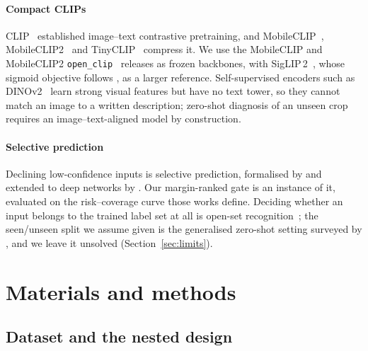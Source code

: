 \documentclass[a4paper,fleqn]{cas-dc}
\begin{document}
\paragraph{Compact CLIPs} CLIP~\citep{radford2021} established image--text contrastive pretraining,
and MobileCLIP~\citep{vasu2024}, MobileCLIP2~\citep{mobileclip2} and TinyCLIP~\citep{wu2023} compress
it. We use the MobileCLIP and MobileCLIP2 \texttt{open\_clip}~\citep{ilharco2021} releases as frozen
backbones, with
SigLIP\,2~\citep{siglip2}, whose sigmoid objective follows \citet{zhai2023}, as a larger reference.
Self-supervised encoders such as DINOv2~\citep{oquab2024} learn strong visual features but have no
text tower, so they cannot match an image to a written description; zero-shot diagnosis of an unseen
crop requires an image--text-aligned model by construction.

\paragraph{Selective prediction} Declining low-confidence inputs is selective prediction, formalised
by \citet{elyaniv2010selective} and extended to deep networks by \citet{geifman2017selective}. Our
margin-ranked gate is an instance of it, evaluated on the risk--coverage curve those works define.
Deciding whether an input belongs to the trained label set at all is open-set
recognition~\citep{scheirer2013openset}; the seen/unseen split we assume given is the generalised
zero-shot setting surveyed by \citet{xian2019gzsl}, and we leave it unsolved (Section~\ref{sec:limits}).

\section{Materials and methods}
\label{sec:methods}

\subsection{Dataset and the nested design}
\label{sec:data}
\end{document}
